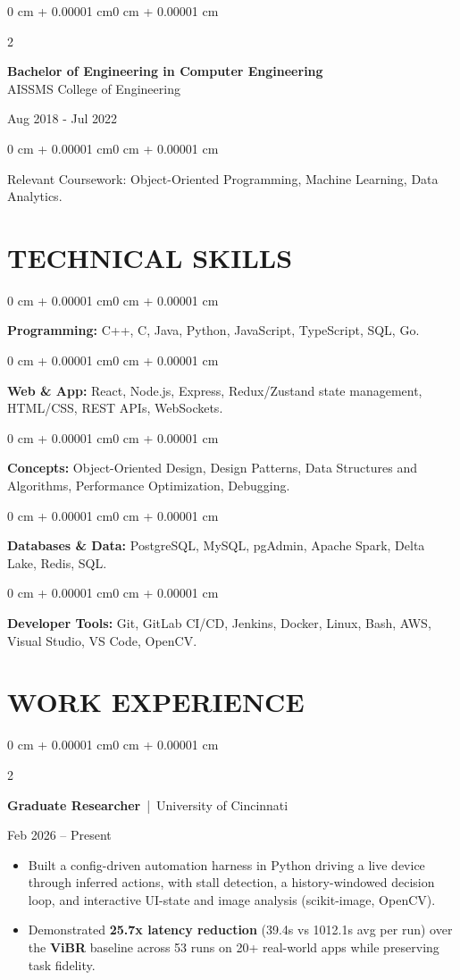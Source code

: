 \documentclass[10pt, letterpaper]{article}
\newenvironment{highlights}{
    \begin{itemize}[
        topsep=0.10 cm,
        parsep=0.06 cm,
        partopsep=0pt,
        itemsep=0.06 cm,
        leftmargin=12pt
    ]
}{
    \end{itemize}
}
\newenvironment{onecolentry}{
    \begin{adjustwidth}{0 cm + 0.00001 cm}{0 cm + 0.00001 cm}
}{
    \end{adjustwidth}
}
\newenvironment{twocolentry}[2][]{
    \onecolentry
    \def\secondColumn{#2}
    \setcolumnwidth{\fill, 4.5 cm}
    \begin{paracol}{2}
}{
    \switchcolumn \raggedleft \secondColumn
    \end{paracol}
    \endonecolentry
}
\begin{document}
\begin{twocolentry}{
    Aug 2018 - Jul 2022
}
    \textbf{Bachelor of Engineering in Computer Engineering} \\
    AISSMS College of Engineering
\end{twocolentry}
\begin{onecolentry}
Relevant Coursework: Object-Oriented Programming, Machine Learning, Data Analytics.
\end{onecolentry}
\section{TECHNICAL SKILLS}
\begin{onecolentry}
\textbf{Programming:} C++, C, Java, Python, JavaScript, TypeScript, SQL, Go.
\end{onecolentry}
\vspace{0.06 cm}
\begin{onecolentry}
\textbf{Web \& App:} React, Node.js, Express, Redux/Zustand state management, HTML/CSS, REST APIs, WebSockets.
\end{onecolentry}
\vspace{0.06 cm}
\begin{onecolentry}
\textbf{Concepts:} Object-Oriented Design, Design Patterns, Data Structures and Algorithms, Performance Optimization, Debugging.
\end{onecolentry}
\vspace{0.06 cm}
\begin{onecolentry}
\textbf{Databases \& Data:} PostgreSQL, MySQL, pgAdmin, Apache Spark, Delta Lake, Redis, SQL.
\end{onecolentry}
\vspace{0.06 cm}
\begin{onecolentry}
\textbf{Developer Tools:} Git, GitLab CI/CD, Jenkins, Docker, Linux, Bash, AWS, Visual Studio, VS Code, OpenCV.
\end{onecolentry}

\section{WORK EXPERIENCE}
\begin{twocolentry}{Feb 2026 -- Present}
\textbf{Graduate Researcher} \,|\, University of Cincinnati
\end{twocolentry}
\begin{highlights}
  \item Built a config-driven automation harness in Python driving a live device through inferred actions, with stall detection, a history-windowed decision loop, and interactive UI-state and image analysis (scikit-image, OpenCV).
  \item Demonstrated \textbf{25.7x latency reduction} (39.4s vs 1012.1s avg per run) over the \textbf{ViBR} baseline across 53 runs on 20+ real-world apps while preserving task fidelity.
\end{highlights}
\end{document}
